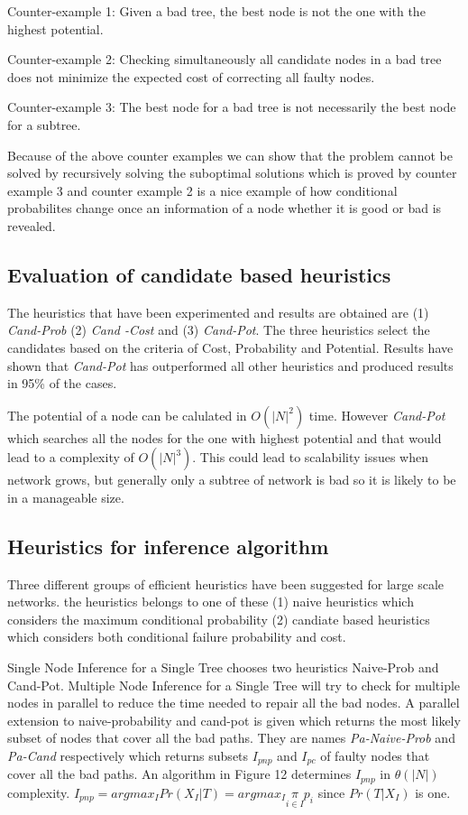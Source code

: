 \documentclass[10pt]{sigplan-proc-varsize}
\begin{document}
Counter-example 1: Given a bad tree, the best node is not the one with the highest potential.

Counter-example 2: Checking simultaneously all candidate nodes in a bad tree does not minimize the expected cost of correcting all faulty nodes.

Counter-example 3: The best node for a bad tree is not necessarily the best node for a subtree.

Because of the above counter examples we can show that the problem cannot be solved by recursively solving the suboptimal solutions which is proved by counter example 3 and counter example 2 is a nice example of how conditional probabilites change once an information of a node whether it is good or bad is revealed. 

\subsection{Evaluation of candidate based heuristics}

The heuristics that have been experimented and results are obtained  are (1) {\it Cand-Prob} (2) {\it Cand -Cost} and (3) {\it Cand-Pot}. The three heuristics select the candidates based on the criteria of Cost, Probability and Potential. Results have shown that {\it Cand-Pot} has outperformed all other heuristics and produced results in 95\% of the cases.

The potential of a node can be calulated in $O(|N|^2)$ time. However {\it Cand-Pot} which searches all the nodes for the one with highest potential and that would lead to a complexity of $O(|N|^3)$. This could lead to scalability issues when network grows, but generally only a subtree of network is bad so it is likely to be in a manageable size.

\subsection {Heuristics for inference algorithm}
Three different groups of efficient heuristics have been suggested for large scale networks. the heuristics belongs to one of these (1) naive heuristics which considers the maximum conditional probability (2) candiate based heuristics which considers both conditional failure probability and cost.

Single Node Inference for a Single Tree chooses  two heuristics Naive-Prob and Cand-Pot. Multiple Node Inference for a Single Tree will try to check for multiple nodes in parallel to reduce the time needed to repair all the bad nodes. A parallel extension to naive-probability and cand-pot is given which returns the most likely subset of nodes that cover all the bad paths. They are names {\it Pa-Naive-Prob} and {\it Pa-Cand} respectively which returns subsets $I_{pnp}$ and $I_{pc}$ of faulty nodes that cover all the bad paths.  An algorithm in Figure 12 determines $I_{pnp}$ in $\theta(|N|)$ complexity. $I_{pnp} = argmax_I Pr(X_I|T )=argmax_I\underset{i\in I}{\pi}p_i$ since $Pr(T |X_I )$ is one.
\end{document}
